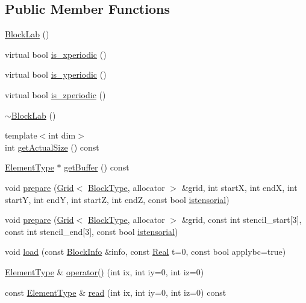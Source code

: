 \subsection*{Public Member Functions}
\begin{DoxyCompactItemize}
\item 
\hyperlink{class_block_lab_a0cb8aec5f42c4b1860be8aa218660087}{Block\+Lab} ()
\item 
virtual bool \hyperlink{class_block_lab_aaf6e3ab940c5c3cf7463bad112527f98}{is\+\_\+xperiodic} ()
\item 
virtual bool \hyperlink{class_block_lab_a5455e54c8e874ee9da6159ea0d1651ed}{is\+\_\+yperiodic} ()
\item 
virtual bool \hyperlink{class_block_lab_a0fd3a720fb3f2f76845ff4323e89bb91}{is\+\_\+zperiodic} ()
\item 
\hyperlink{class_block_lab_a083218471f59c32fccc335759734667d}{$\sim$\+Block\+Lab} ()
\item 
{\footnotesize template$<$int dim$>$ }\\int \hyperlink{class_block_lab_aa45e40066bececd40de75c238c346e79}{get\+Actual\+Size} () const 
\item 
\hyperlink{class_block_lab_accdcd2d5e815a8497e5ef9ae884da6b6}{Element\+Type} $\ast$ \hyperlink{class_block_lab_a4dd07a50f8766b29717b9326e67a9fcd}{get\+Buffer} () const 
\item 
void \hyperlink{class_block_lab_ad529f8c851da336419ad63c25ba76429}{prepare} (\hyperlink{class_grid}{Grid}$<$ \hyperlink{class_block_lab_a745b3c9ac17f6743d11a7085196981a0}{Block\+Type}, allocator $>$ \&grid, int start\+X, int end\+X, int start\+Y, int end\+Y, int start\+Z, int end\+Z, const bool \hyperlink{class_block_lab_ade306bb6935a0ead765444534c2e05db}{istensorial})
\item 
void \hyperlink{class_block_lab_ac6236e1c94d13fa1025c8253b9855a04}{prepare} (\hyperlink{class_grid}{Grid}$<$ \hyperlink{class_block_lab_a745b3c9ac17f6743d11a7085196981a0}{Block\+Type}, allocator $>$ \&grid, const int stencil\+\_\+start\mbox{[}3\mbox{]}, const int stencil\+\_\+end\mbox{[}3\mbox{]}, const bool \hyperlink{class_block_lab_ade306bb6935a0ead765444534c2e05db}{istensorial})
\item 
void \hyperlink{class_block_lab_aefd27fed8fbb1d3d60fe1457ae90f248}{load} (const \hyperlink{struct_block_info}{Block\+Info} \&info, const \hyperlink{_h_d_f5_dumper_8h_a445a5f0e2a34c9d97d69a3c2d1957907}{Real} t=0, const bool applybc=true)
\item 
\hyperlink{class_block_lab_accdcd2d5e815a8497e5ef9ae884da6b6}{Element\+Type} \& \hyperlink{class_block_lab_abd79a09ab5b54cf04bfe25c125ea1edf}{operator()} (int ix, int iy=0, int iz=0)
\item 
const \hyperlink{class_block_lab_accdcd2d5e815a8497e5ef9ae884da6b6}{Element\+Type} \& \hyperlink{class_block_lab_a3e06d4124f7d69923b4ee6345c105cfc}{read} (int ix, int iy=0, int iz=0) const 
\end{DoxyCompactItemize}
